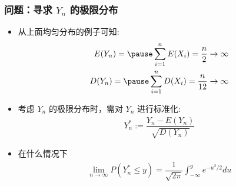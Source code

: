\documentclass[Prob-All.tex]{subfiles}
\begin{document}
\begin{frame}
	\frametitle{问题：寻求 $Y_n$ 的极限分布}
	\begin{itemize}[<+-|alert@+>]
		\item 从上面均匀分布的例子可知:
		\begin{eqnarray*}
			E(Y_n)=\pause \sum_{i=1}^nE(X_i)=\dfrac{n}{2}\rightarrow\infty\\
			D(Y_n)=\pause \sum_{i=1}^n D(X_i)=\dfrac{n}{12}\rightarrow\infty
		\end{eqnarray*}
		\item 考虑 $Y_n$ 的极限分布时，需对 $Y_n$ 进行标准化:
		\begin{eqnarray*}
			Y_n^*:=\dfrac{Y_n-E(Y_n)}{\sqrt{D(Y_n)}}
		\end{eqnarray*}
		\item 在什么情况下
		\begin{eqnarray*}
			\lim_{n\rightarrow\infty}P(Y_n^*\le y)=\dfrac{1}{\sqrt{2\pi}}\int_{-\infty}^ye^{-u^2/2}du
		\end{eqnarray*}

	\end{itemize}
\end{frame}
\end{document}
